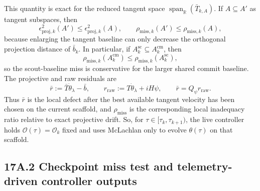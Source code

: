 \documentclass[11pt]{article}
\begin{document}
This quantity is exact for the reduced tangent space \(\operatorname{span}_{\mathbb R}(\bar T_{k,A})\). If \(A\subseteq A'\) as tangent subspaces, then
\[
\epsilon_{\mathrm{proj},k}^2(A')\le \epsilon_{\mathrm{proj},k}^2(A),
\qquad
\rho_{\mathrm{miss},k}(A')\le \rho_{\mathrm{miss},k}(A),
\]
because enlarging the tangent baseline can only decrease the orthogonal projection distance of \(\bar b_k\). In particular, if \(A_k^{\mathrm{sc}}\subseteq A_k^{\mathrm{cm}}\), then
\[
\rho_{\mathrm{miss},k}(A_k^{\mathrm{cm}})
\le
\rho_{\mathrm{miss},k}(A_k^{\mathrm{sc}}),
\]
so the scout-baseline miss is conservative for the larger shared commit baseline.
The projective and raw residuals are
\[
\bar r:=\bar T\dot\theta_\lambda-\bar b,
\qquad
r_{\mathrm{raw}}:=T\dot\theta_\lambda+iH\psi,
\qquad
\bar r=Q_\psi r_{\mathrm{raw}}.
\]
Thus \(\bar r\) is the local defect after the best available tangent velocity has been chosen on the current scaffold, and \(\rho_{\mathrm{miss}}\) is the corresponding local inadequacy ratio relative to exact projective drift. So, for \(\tau\in[\tau_k,\tau_{k+1})\), the live controller holds \(\mathcal O(\tau)=\mathcal O_k\) fixed and uses McLachlan only to evolve \(\theta(\tau)\) on that scaffold.

\subsection*{17A.2 Checkpoint miss test and telemetry-driven controller outputs}
\end{document}
